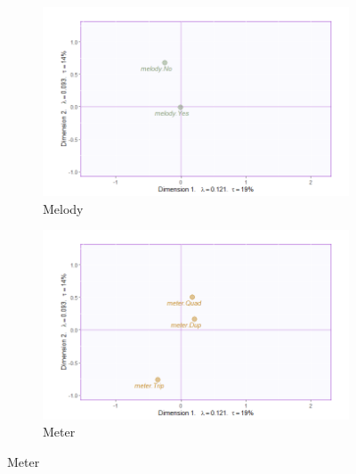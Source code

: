 \documentclass[
]{article}
\begin{document}
\begin{figure}[H]
\begin{subfigure}[b]{.45\linewidth}
\includegraphics[width=\linewidth]{./supmatsimgs/qjmelody.png}
\caption{Melody}\label{fig:melody}
\end{subfigure}
\begin{subfigure}[b]{.45\linewidth}
\includegraphics[width=\linewidth]{./supmatsimgs/qjmeter.png}
\caption{Meter}\label{fig:meter}
\end{subfigure}
\end{figure}
\end{document}
